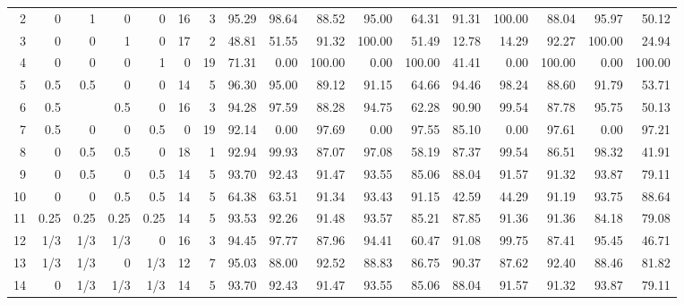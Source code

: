 \begin{landscape}
\begin{table}[p]
{\begin{tabular}{rrrrrrrrrrrrrrrrr}
2 & 0 & 1 & 0 & 0 & \multicolumn{1}{|r}{16} & 3 & \multicolumn{1}{|r}{95.29} & 98.64 & 88.52 & 95.00 & 64.31 & \multicolumn{1}{|r}{91.31} & 100.00 & 88.04 & 95.97 & 50.12 \\
3 & 0 & 0 & 1 & 0 & \multicolumn{1}{|r}{17} & 2 & \multicolumn{1}{|r}{48.81} & 51.55 & 91.32 & 100.00 & 51.49 & \multicolumn{1}{|r}{12.78} & 14.29 & 92.27 & 100.00 & 24.94 \\
4 & 0 & 0 & 0 & 1 & \multicolumn{1}{|r}{0} & 19 & \multicolumn{1}{|r}{71.31} & 0.00 & 100.00 & 0.00 & 100.00 & \multicolumn{1}{|r}{41.41} & 0.00 & 100.00 & 0.00 & 100.00 \\
5 & 0.5 & 0.5 & 0 & 0 & \multicolumn{1}{|r}{14} & 5 & \multicolumn{1}{|r}{96.30} & 95.00 & 89.12 & 91.15 & 64.66 & \multicolumn{1}{|r}{94.46} & 98.24 & 88.60 & 91.79 & 53.71 \\
6 & 0.5 &  & 0.5 & 0 & \multicolumn{1}{|r}{16} & 3 & \multicolumn{1}{|r}{94.28} & 97.59 & 88.28 & 94.75 & 62.28 & \multicolumn{1}{|r}{90.90} & 99.54 & 87.78 & 95.75 & 50.13 \\
7 & 0.5 & 0 & 0 & 0.5 & \multicolumn{1}{|r}{0} & 19 & \multicolumn{1}{|r}{92.14} & 0.00 & 97.69 & 0.00 & 97.55 & \multicolumn{1}{|r}{85.10} & 0.00 & 97.61 & 0.00 & 97.21 \\
8 & 0 & 0.5 & 0.5 & 0 & \multicolumn{1}{|r}{18} & 1 & \multicolumn{1}{|r}{92.94} & 99.93 & 87.07 & 97.08 & 58.19 & \multicolumn{1}{|r}{87.37} & 99.54 & 86.51 & 98.32 & 41.91 \\
9 & 0 & 0.5 & 0 & 0.5 & \multicolumn{1}{|r}{14} & 5 & \multicolumn{1}{|r}{93.70} & 92.43 & 91.47 & 93.55 & 85.06 & \multicolumn{1}{|r}{88.04} & 91.57 & 91.32 & 93.87 & 79.11 \\
10 & 0 & 0 & 0.5 & 0.5 & \multicolumn{1}{|r}{14} & 5 & \multicolumn{1}{|r}{64.38} & 63.51 & 91.34 & 93.43 & 91.15 & \multicolumn{1}{|r}{42.59} & 44.29 & 91.19 & 93.75 & 88.64 \\
11 & 0.25 & 0.25 & 0.25 & 0.25 & \multicolumn{1}{|r}{14} & 5 & \multicolumn{1}{|r}{93.53} & 92.26 & 91.48 & 93.57 & 85.21 & \multicolumn{1}{|r}{87.85} & 91.36 & 91.36 & 84.18 & 79.08 \\
12 & 1/3 & 1/3 & 1/3 & 0 & \multicolumn{1}{|r}{16} & 3 & \multicolumn{1}{|r}{94.45} & 97.77 & 87.96 & 94.41 & 60.47 & \multicolumn{1}{|r}{91.08} & 99.75 & 87.41 & 95.45 & 46.71 \\
13 & 1/3 & 1/3 & 0 & 1/3 & \multicolumn{1}{|r}{12} & 7 & \multicolumn{1}{|r}{95.03} & 88.00 & 92.52 & 88.83 & 86.75 & \multicolumn{1}{|r}{90.37} & 87.62 & 92.40 & 88.46 & 81.82 \\
14 & 0 & 1/3 & 1/3 & 1/3 & \multicolumn{1}{|r}{14} & 5 & \multicolumn{1}{|r}{93.70} & 92.43 & 91.47 & 93.55 & 85.06 & \multicolumn{1}{|r}{88.04} & 91.57 & 91.32 & 93.87 & 79.11
\end{tabular}
}
\end{table}
\end{landscape}


